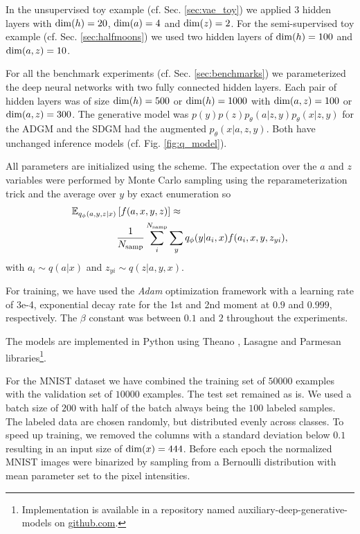 \documentclass{article}
\begin{document}
In the unsupervised toy example (cf. Sec. \ref{sec:vae_toy}) we applied 3 hidden layers with ${\rm dim}(h)=20$, ${\rm dim}(a)=4$ and ${\rm dim}(z)=2$. For the semi-supervised toy example (cf. Sec. \ref{sec:halfmoons}) we used two hidden layers of ${\rm dim}(h)=100$ and ${\rm dim}(a,z)=10$.

For all the benchmark experiments (cf. Sec. \ref{sec:benchmarks}) we parameterized the deep neural networks with  two fully connected hidden layers. Each pair of hidden layers was of size ${\rm dim}(h)=500$ or ${\rm dim}(h)=1000$ with ${\rm dim}(a,z)=100$  or ${\rm dim}(a,z)=300$. The generative model was $p(y)p(z)p_\theta(a|z,y)p_\theta(x|z,y)$ for the ADGM and the SDGM had the augmented $p_\theta(x|a,z,y)$. Both have unchanged inference models (cf. Fig. \ref{fig:q_model}).

All parameters are initialized using the \citet{Glorot10} scheme. The expectation over the $a$ and $z$ variables were performed by Monte Carlo sampling using the reparameterization trick \citep{Kingma13,Rezende14} and the average over $y$ by exact enumeration so 
\begin{align}
\mathbb{E}_{q_\phi(a,y,z|x)}
&\left[f(a,x,y,z)\right] \approx \\ 
&\frac{1}{N_{\rm samp}} \sum_i^{N_{\rm samp}} \sum_y q_\phi(y|a_i,x) f(a_i,x,y,z_{yi}), \nonumber
\end{align}
with $a_i \sim q(a|x)$ and $z_{yi} \sim q(z|a,y,x)$.

For training, we have used the \textit{Adam} \citep{Kingma14a} optimization framework with a learning rate of 3e-4, exponential decay rate for the 1st and 2nd moment at $0.9$ and $0.999$, respectively. The $\beta$ constant was between $0.1$ and $2$ throughout the experiments.

The models are implemented in Python using Theano \citep{Bastien12}, Lasagne \citep{Dieleman15} and Parmesan libraries\footnote{Implementation is available in a repository named auxiliary-deep-generative-models on \url{github.com}.}. 

For the MNIST dataset we have combined the training set of $50000$ examples with the validation set of $10000$ examples. The test set remained as is. We used a batch size of $200$ with half of the batch always being the $100$ labeled samples. The labeled data are chosen randomly, but distributed evenly across classes. To speed up training, we removed the columns with a standard deviation below $0.1$ resulting in an input size of ${\rm dim}(x)=444$. Before each epoch the normalized MNIST images were binarized by sampling from a Bernoulli distribution with mean parameter set to the pixel intensities.
\end{document}
